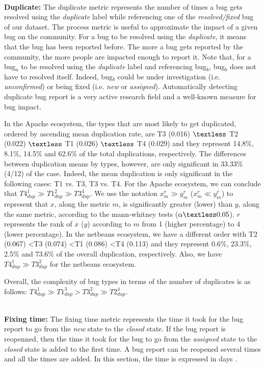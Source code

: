 \\ \vspace{0.1cm} {\bf Duplicate: }
The duplicate metric represents the number of times a bug gets resolved using the {\it duplicate} label while referencing one of the {\it resolved/fixed} bug of our dataset.
The process metric is useful to approximate the impact of a given bug on the community.
For a bug to be resolved using the {\it duplicate}, it means that the bug has been reported before.
The more a bug gets reported by the community, the more people are impacted enough to report it.
Note that, for a bug$_a$ to be resolved using the {\it duplicate} label and referencing bug$_b$, bug$_b$ does not have to resolved itself.
Indeed, bug$_b$ could be under investigation (i.e. {\it unconfirmed}) or being fixed (i.e. {\it new} or {\it assigned}).
Automatically detecting duplicate bug report is a very active research field \cite{Sun2011,Bettenburg2008a,Nguyen2012,Jalbert2008,Tian2012a,Runeson2007} and a well-known measure for bug impact.

In the Apache ecosystem, the types that are  most likely to get duplicated, ordered by ascending mean duplication rate, are T3 (0.016) $\textless$ T2 (0.022) $\textless$ T1 (0.026) $\textless$ T4 (0.029) and they represent 14.8\%, 8.1\%, 14.5\% and 62.6\% of the total duplications, respectively.
The differences between duplication means by types, however, are only significant in 33.33\% (4/12) of the case.
Indeed, the mean duplication is only significant in the following cases: T1 vs. T3, T3 vs. T4.
For the Apache ecosystem, we can conclude that $T4_{dup}^1 \gg T1_{dup}^2 \gg T3_{dup}^4$.
We use the notation  $x_{m}^r \gg y_{m}^r$ ($x_{m}^r \ll y_{m}^r$) to represent that $x$, along the metric $m$, is significantly greater (lower) than $y$, along the same metric, according to the mann-whitney tests ($\alpha \textless 0.05$).
$r$ represents the rank of $x$ ($y$) according to $m$ from 1 (higher percentage) to 4 (lower percentage).
In the netbeans ecosystem, we have a different order with T2 (0.067) \textless T3 (0.074) \textless T1 (0.086) \textless T4 (0.113) and they represent 0.6\%, 23.3\%, 2.5\% and 73.6\% of the overall duplication, respectively. Also, we have $T4_{dup}^1 \gg T3_{dup}^2$ for the netbeans ecosystem.

Overall, the complexity of bug types in terms of the number of duplicates is as follows:  $T4_{dup}^{1} \gg T1_{dup}^{3} > T3_{dup}^{2} \gg T2_{dup}^{4}$.


\\ \vspace{0.1cm} {\bf Fixing time: } The fixing time metric represents the time it took for the bug report to go from the {\it new} state to the {\it closed} state.
If the bug report is reopenned, then the time it took for the bug to go from the {\it assigned} state to the {\it closed} state is added to the first time.
A bug report can be reopened several times and all the times are added.
In this section, the time is expressed in days \cite{Weiss2007,Zhang2012,Zhang2013}.



